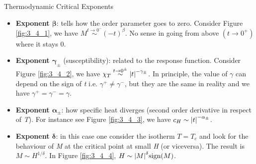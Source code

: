 \documentclass[../main/main.tex]{subfiles}
\begin{document}
\begin{definition}{Thermodynamic Critical Exponents}{}
\begin{itemize}
\item \textbf{Exponent \( \pmb{\beta} \)}: tells how the order parameter goes to zero.
Consider Figure \ref{fig:3_4_1}, we have \( M \overset{t \rightarrow  0^-}{\sim} (-t)^{\beta }  \). No sense in going from above \( (t \rightarrow 0^+) \) where it stays 0.

\item \textbf{Exponent \(\pmb{ \gamma _{\pm} } \)} (susceptibility): related to the response function. Consider Figure \ref{fig:3_4_2}, we have \( \chi _T \overset{t \rightarrow 0^{\pm}}{\sim} \abs{t}^{-\gamma _{\pm} }   \). In principle, the value of \( \gamma   \) can depend on the sign of \emph{t} i.e.   \( \gamma ^+ \neq \gamma ^-  \), but they are the same in reality and we have \( \gamma ^+ = \gamma ^- = \gamma     \).

\item \textbf{Exponent \(\pmb{ \alpha _{\pm} }\)}: how specific heat diverges (second order derivative in respect of \emph{T}). For instance see Figure \ref{fig:3_4_3}, we have \( c_H \sim \abs{t}^{-\alpha _{\pm}}  \).

\item \textbf{Exponent \( \pmb{\delta   }\)}: in this case one consider the isotherm \( T =T_c \) and look for the behaviour of \emph{M} at the critical point at small \emph{H} (or viceversa).  The result is \( M \sim H^{1/\delta } \).
In Figure \ref{fig:3_4_4}, \( H \sim \abs{M}^{\delta } \text{sign} (M)  \).

\end{itemize}
\end{definition}
\end{document}
